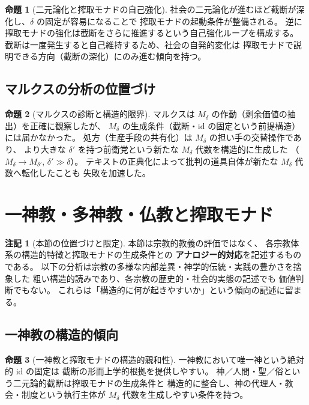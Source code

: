 \documentclass[11pt,a4paper]{ltjsarticle}
\newcommand{\Mdelta}{M_\delta}
\theoremstyle{definition}
\newtheorem{proposition}{命題}[section]
\newtheorem{remark}{注記}[section]
\begin{document}
\begin{proposition}[二元論化と搾取モナドの自己強化]
社会の二元論化が進むほど截断が深化し、$\delta$ の固定が容易になることで
搾取モナドの起動条件が整備される。
逆に搾取モナドの強化は截断をさらに推進するという自己強化ループを構成する。
截断は一度発生すると自己維持するため、社会の自発的変化は
搾取モナドで説明できる方向（截断の深化）にのみ進む傾向を持つ。
\end{proposition}

\subsection{マルクスの分析の位置づけ}

\begin{proposition}[マルクスの診断と構造的限界]
マルクスは $\Mdelta$ の作動（剰余価値の抽出）を正確に観察したが、
$\Mdelta$ の生成条件（截断・$\mathrm{id}$ の固定という前提構造）には届かなかった。
処方（生産手段の共有化）は $\Mdelta$ の担い手の交替操作であり、
より大きな $\delta'$ を持つ前衛党という新たな $\Mdelta$ 代数を構造的に生成した
（$M_\delta \to M_{\delta'}$, $\delta' \gg \delta$）。
テキストの正典化によって批判の道具自体が新たな $\Mdelta$ 代数へ転化したことも
失敗を加速した。
\end{proposition}

\section{一神教・多神教・仏教と搾取モナド}

\begin{remark}[本節の位置づけと限定]
本節は宗教的教義の評価ではなく、
各宗教体系の構造的特徴と搾取モナドの生成条件との
\textbf{アナロジー的対応}を記述するものである。
以下の分析は宗教の多様な内部差異・神学的伝統・実践の豊かさを捨象した
粗い構造的読みであり、各宗教の歴史的・社会的実態の記述でも
価値判断でもない。
これらは「構造的に何が起きやすいか」という傾向の記述に留まる。
\end{remark}

\subsection{一神教の構造的傾向}

\begin{proposition}[一神教と搾取モナドの構造的親和性]
一神教において唯一神という絶対的 $\mathrm{id}$ の固定は
截断の形而上学的根拠を提供しやすい。
神／人間・聖／俗という二元論的截断は搾取モナドの生成条件と
構造的に整合し、神の代理人・教会・制度という執行主体が
$\Mdelta$ 代数を生成しやすい条件を持つ。
\end{proposition}
\end{document}

